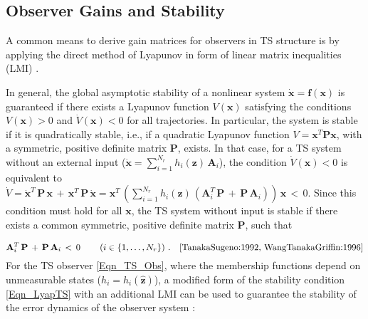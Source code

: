 \documentclass[a4paper]{article}
\newcommand{\xP}{\dot{x}}
\newcommand{\B}[1]{\mathbf{#1}}
\begin{document}
\subsection{\label{Sec_Gains_and_Stability}Observer Gains and Stability}

A common means to derive gain matrices for observers in TS structure is by applying the direct method of Lyapunov in form of linear matrix inequalities (LMI) \cite{Lendek:2010}.

In general, the global asymptotic stability of a nonlinear system $\B{\xP} = \B{f}\left(\B{x}\right)$ is guaranteed if there exists a Lyapunov function $V\left(\B{x}\right)$ satisfying the conditions $V\left(\B{x}\right) > 0$ and $\dot{V}\left(\B{x}\right) < 0$ for all trajectories. In particular, the system is stable if it is quadratically stable, i.e., if a quadratic Lyapunov function $V = \B{x}^T\B{P}\B{x}$, with a symmetric, positive definite matrix $\B{P}$, exists.
\newline In that case, for a TS system without an external input ($\B{\xP} = \sum_{i=1}^{N_r} h_i\left(\B{z}\right)\, \B{A}_i$), the condition $\dot{V}\left(\B{x}\right) < 0$ is equivalent to
$ \dot{V} =  \B{\xP}^T\,\B{P}\,\B{x} \, + \, \B{x}^T\,\B{P}\,\B{\xP} = 
					\B{x}^T \, \left(\sum_{i=1}^{N_r} h_i\left(\B{z}\right)\,\left( \B{A}^T_i \,\B{P} \, + \, \B{P}\,\B{A}_i \right) \right) \, \B{x} \, < \, 0 $. Since this condition must hold for all $\B{x}$, the TS system without input is stable if there exists a common symmetric, positive definite matrix $\B{P}$, such that


\begin{equation}
 \B{A}^T_i \,\B{P} \, + \, \B{P}\,\B{A}_i \, < \, 0 \qquad \left(i \in \left\lbrace 1,\dots , N_r\right\rbrace \right) \, . \quad \cite{TanakaSugeno:1992, WangTanakaGriffin:1996}
 \label{Eqn_LyapTS}
\end{equation}
\newline For the TS observer \eqref{Eqn_TS_Obs}, where the membership functions depend on unmeasurable states ($h_i = h_i\left(\widehat{\B{z}}\right)$), a modified form of the stability condition \eqref{Eqn_LyapTS} with an additional LMI can be used to guarantee the stability of the error dynamics of the observer system \cite{BergstenPalmDriankov:2001}:
\end{document}
